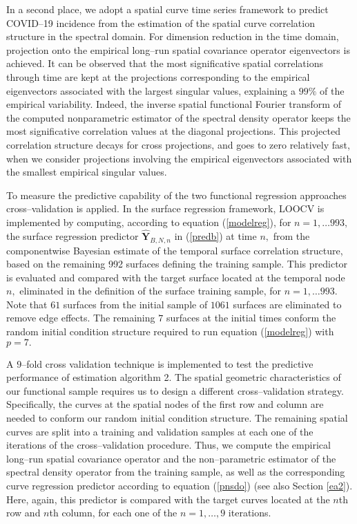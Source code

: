 \documentclass[11pt,a4paper]{article}
\begin{document}
In a second place, we adopt a spatial curve time series framework to predict COVID--19 incidence from the estimation of the spatial curve correlation structure in the spectral domain. For dimension reduction in the time domain, projection onto the empirical  long--run spatial covariance operator eigenvectors  is achieved. It can be observed that  the most significative spatial correlations through time are kept at the projections corresponding to the empirical eigenvectors associated with the largest singular values, explaining a $99\%$ of the empirical variability. Indeed, the inverse spatial functional Fourier transform of the computed nonparametric estimator of the spectral density operator keeps  the most  significative correlation values at the diagonal projections. This projected correlation structure decays for cross projections, and goes to zero relatively fast, when we consider  projections involving the empirical eigenvectors associated with the smallest empirical singular values.

To measure the predictive capability of the two functional regression  approaches cross--validation is applied. In the surface regression framework,  LOOCV is implemented by computing, according to equation  (\ref{modelreg}), for  $n=1,\dots 993,$ the surface regression  predictor $\widehat{\mathbf{Y}}_{B,N,n}$ in (\ref{predb}) at time $n,$   from the  componentwise Bayesian estimate of the temporal surface correlation structure, based on the remaining 992 surfaces defining the training sample. This predictor is evaluated and compared with the target surface  located at the temporal node $n,$ eliminated in the definition of the surface training sample, for  $n=1,\dots 993.$  Note that  $61$ surfaces from the initial sample of $1061$ surfaces  are eliminated  to remove edge effects. The remaining  $7$ surfaces at the initial times conform the random initial condition structure  required to run equation (\ref{modelreg})  with $p=7.$

A $9$--fold cross validation technique is implemented  to test the predictive performance of estimation algorithm 2.   The spatial geometric characteristics of our functional sample requires us to design a different cross--validation strategy. Specifically,  the curves at the spatial nodes of the first row and column are needed to conform our random initial condition structure. The remaining spatial curves are split into a training and validation samples at each one of the iterations of the cross--validation procedure. Thus, we compute the empirical long--run spatial covariance operator and the non--parametric estimator of the spectral density operator from the training sample, as well as the corresponding  curve regression predictor according to equation (\ref{pnsdo}) (see also Section \ref{ea2}). Here, again, this predictor is compared with the target curves located at the $n$th row and $n$th column, for each one of the  $n=1,\dots,9$ iterations.
\end{document}
